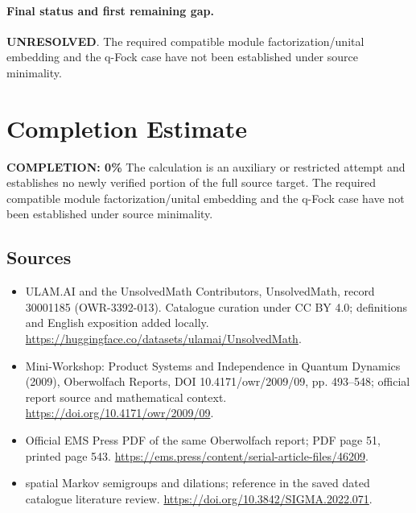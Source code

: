 \documentclass[11pt]{article}
\begin{document}
\paragraph{Final status and first remaining gap.}
\textbf{UNRESOLVED}. The required compatible module factorization/unital embedding and the q-Fock case have not been established under source minimality.

\section{Completion Estimate}
\noindent\textbf{COMPLETION: 0\%}
The calculation is an auxiliary or restricted attempt and establishes no newly verified portion of the full source target. The required compatible module factorization/unital embedding and the q-Fock case have not been established under source minimality.

\subsection{Sources}
\begin{itemize}
\item[\hypertarget{source:30001185:1}{S1}] ULAM.AI and the UnsolvedMath Contributors, UnsolvedMath, record 30001185 (OWR-3392-013). Catalogue curation under CC BY 4.0; definitions and English exposition added locally.
\url{https://huggingface.co/datasets/ulamai/UnsolvedMath}.
\item[\hypertarget{source:30001185:2}{S2}] Mini-Workshop: Product Systems and Independence in Quantum Dynamics (2009), Oberwolfach Reports, DOI 10.4171/owr/2009/09, pp. 493--548; official report source and mathematical context.
\url{https://doi.org/10.4171/owr/2009/09}.
\item[\hypertarget{source:30001185:3}{S3}] Official EMS Press PDF of the same Oberwolfach report; PDF page 51, printed page 543.
\url{https://ems.press/content/serial-article-files/46209}.
\item[\hypertarget{source:30001185:4}{S4}] spatial Markov semigroups and dilations; reference in the saved dated catalogue literature review.
\url{https://doi.org/10.3842/SIGMA.2022.071}.
\end{itemize}
\label{end:30001185}
\end{document}
